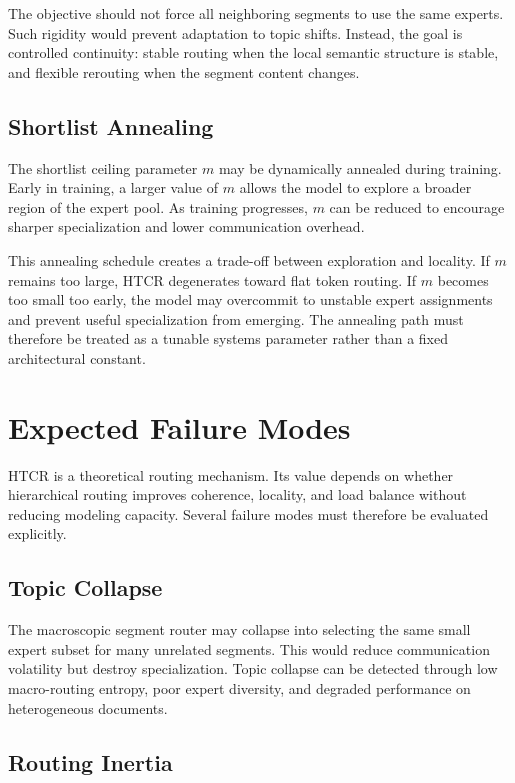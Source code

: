 The objective should not force all neighboring segments to use the same experts. Such rigidity would prevent adaptation to topic shifts. Instead, the goal is controlled continuity: stable routing when the local semantic structure is stable, and flexible rerouting when the segment content changes.

\section{Shortlist Annealing}

The shortlist ceiling parameter $m$ may be dynamically annealed during training. Early in training, a larger value of $m$ allows the model to explore a broader region of the expert pool. As training progresses, $m$ can be reduced to encourage sharper specialization and lower communication overhead.

This annealing schedule creates a trade-off between exploration and locality. If $m$ remains too large, HTCR degenerates toward flat token routing. If $m$ becomes too small too early, the model may overcommit to unstable expert assignments and prevent useful specialization from emerging. The annealing path must therefore be treated as a tunable systems parameter rather than a fixed architectural constant.

\chapter{Expected Failure Modes}

HTCR is a theoretical routing mechanism. Its value depends on whether hierarchical routing improves coherence, locality, and load balance without reducing modeling capacity. Several failure modes must therefore be evaluated explicitly.

\section{Topic Collapse}

The macroscopic segment router may collapse into selecting the same small expert subset for many unrelated segments. This would reduce communication volatility but destroy specialization. Topic collapse can be detected through low macro-routing entropy, poor expert diversity, and degraded performance on heterogeneous documents.

\section{Routing Inertia}

